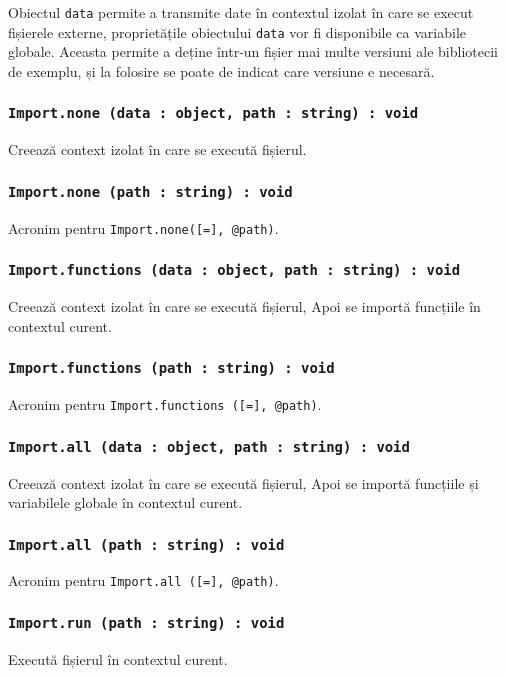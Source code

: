 Obiectul \texttt{data} permite a transmite date în contextul izolat în care se execut fișierele externe, proprietățile obiectului \texttt{data} vor fi disponibile ca variabile globale. Aceasta permite a deține într-un fișier mai multe versiuni ale bibliotecii de exemplu, și la folosire se poate de indicat care versiune e necesară.

\subsubsection{\texttt{Import.none (data : object, path : string) : void}}

Creează context izolat în care se execută fișierul.

\subsubsection{\texttt{Import.none (path : string) : void}}

Acronim pentru \texttt{Import.none([=], @path)}.

\subsubsection{\texttt{Import.functions (data : object, path : string) : void}}

Creează context izolat în care se execută fișierul, Apoi se importă funcțiile în contextul curent.

\subsubsection{\texttt{Import.functions (path : string) : void}}

Acronim pentru \texttt{Import.functions ([=], @path)}.

\subsubsection{\texttt{Import.all (data : object, path : string) : void}}

Creează context izolat în care se execută fișierul, Apoi se importă funcțiile și variabilele globale în contextul curent.

\subsubsection{\texttt{Import.all (path : string) : void}}

Acronim pentru \texttt{Import.all ([=], @path)}.

\subsubsection{\texttt{Import.run (path : string) : void}}

Execută fișierul în contextul curent.

